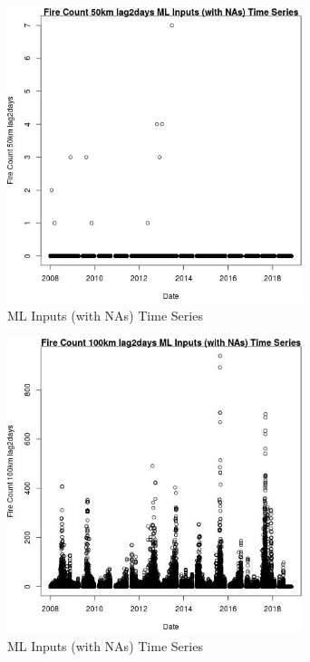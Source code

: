 \begin{figure} 
\centering  
\includegraphics[width=0.77\textwidth]{Code_Outputs/Report_ML_input_PM25_Step4_part_e_de_duplicated_aves_compiled_2019-05-20wNAs_Fire_Count_50km_lag2daysvDate.jpg} 
\caption{\label{fig:Report_ML_input_PM25_Step4_part_e_de_duplicated_aves_compiled_2019-05-20wNAsFire_Count_50km_lag2daysvDate}ML Inputs (with NAs) Time Series} 
\end{figure} 
 

\begin{figure} 
\centering  
\includegraphics[width=0.77\textwidth]{Code_Outputs/Report_ML_input_PM25_Step4_part_e_de_duplicated_aves_compiled_2019-05-20wNAs_Fire_Count_100km_lag2daysvDate.jpg} 
\caption{\label{fig:Report_ML_input_PM25_Step4_part_e_de_duplicated_aves_compiled_2019-05-20wNAsFire_Count_100km_lag2daysvDate}ML Inputs (with NAs) Time Series} 
\end{figure} 
 


